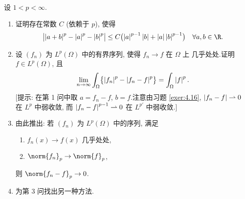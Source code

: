 \begin{exercise}
\label{exer:4.17}
设 $1<p<\infty$.
\begin{enumerate}[label=\arabic*., leftmargin=2.2em, itemsep=0.35em]
	\item 证明存在常数 $C$ (依赖于 $p$), 使得
	      \begin{equation*}
	      \bigl|\abs{a+b}^p-\abs{a}^p-\abs{b}^p\bigr|
	      \le C\bigl(\abs{a}^{p-1}\abs{b}+\abs{a}\abs{b}^{p-1}\bigr)
	      \quad\forall a,b\in\R.
	      \end{equation*}
	\item 设 $(f_n)$ 为 $L^p(\Omega)$ 中的有界序列, 使得 $f_n\to f$ 在 $\Omega$ 上
	      几乎处处.证明 $f\in L^p(\Omega)$, 且
	      \begin{equation*}
	      \lim_{n\to\infty}\int_\Omega\bigl\{\left|f_n\right|^p-\left|f_n-f\right|^p\bigr\}
	      =\int_\Omega\left|f\right|^p.
	      \end{equation*}
	      [提示: 在第 1 问中取 $a=f_n-f$, $b=f$.注意由习题  \ref{exer:4.16},
	      $\left|f_n-f\right|\rightharpoonup0$ 在 $L^p$ 中弱收敛, 而 $\left|f_n-f\right|^{p-1}
	      \rightharpoonup0$ 在 $L^{p'}$ 中弱收敛.]
	\item 由此推出: 若 $(f_n)$ 为 $L^p(\Omega)$ 中的序列, 满足
	      \begin{enumerate}[label=(\roman*), leftmargin=2.4em, itemsep=0.1em]
	      	\item $f_n(x)\to f(x)$ 几乎处处,
	      	\item $\norm{f_n}_p\to\norm{f}_p$,
	      \end{enumerate}
	      则 $\norm{f_n-f}_p\to0$.
	\item 为第 3 问找出另一种方法.
\end{enumerate}
\end{exercise}

